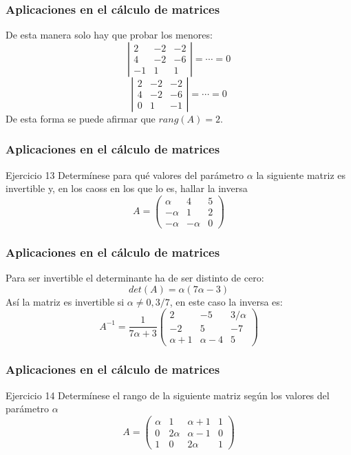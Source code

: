 \documentclass[aspectratio=169]{beamer}
\begin{document}
   \begin{frame}
  \frametitle{Aplicaciones en el c\'alculo de matrices}
De esta manera solo hay que probar los menores:
\[\left|\begin{array}{ccc}2 & -2 & -2 \\4 & -2 & -6 \\-1 & 1 & 1\end{array}\right|=\cdots=0\]
\[\left|\begin{array}{ccc}2 & -2 & -2 \\4 & -2 & -6 \\0 & 1 & -1\end{array}\right|=\cdots=0\]
De esta forma se puede afirmar que $rang(A) = 2$.
\end{frame}  


     \begin{frame}
  \frametitle{Aplicaciones en el c\'alculo de matrices}
     \begin{block}{Ejercicio 13}
Determ\'inese para qu\'e valores del par\'ametro $\alpha$ la siguiente matriz es invertible y, en los caoss en los que lo es, hallar la inversa
\[A = \left(\begin{array}{ccc} \alpha & 4 & 5 \\ -\alpha & 1 & 2 \\ -\alpha & -\alpha & 0 \end{array}\right)\]
\end{block}
\end{frame} 



     \begin{frame}
  \frametitle{Aplicaciones en el c\'alculo de matrices}
Para ser invertible el determinante ha de ser distinto de cero:
\[det(A) = \alpha(7\alpha-3)\]
As\'i la matriz es invertible si $\alpha \neq 0, 3/7$,  en este caso la inversa es: 
\[A^{-1} = \frac{1}{7\alpha+3} \left(\begin{array}{ccc} 2 & -5 & 3/\alpha \\ -2 & 5 & -7 \\ \alpha+1 & \alpha-4 & 5 \end{array}\right) \]
\end{frame} 


     \begin{frame}
  \frametitle{Aplicaciones en el c\'alculo de matrices}
     \begin{block}{Ejercicio 14}
Determ\'inese el rango de la siguiente matriz seg\'un los valores del par\'ametro $\alpha$
\[A = \left(\begin{array}{cccc} \alpha & 1 & \alpha+1 & 1 \\ 0& 2\alpha & \alpha-1 & 0 \\ 1&0 & 2\alpha & 1 \end{array}\right)\]
\end{block}
\end{frame} 
\end{document}
